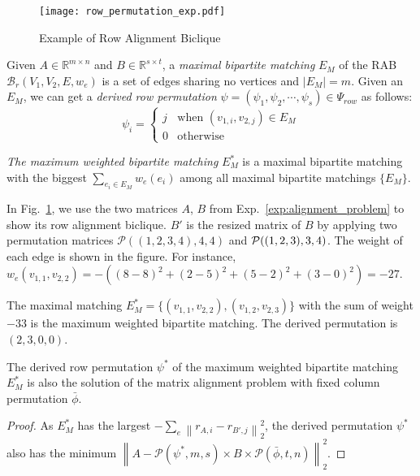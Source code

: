 \documentclass[conference]{IEEEtran}
\begin{document}
{\begin{figure}[h!]
\centering
\texttt{[image: row\_permutation\_exp.pdf]}
\caption{Example of Row Alignment Biclique}
\label{fig:row_permutation_exp}
\end{figure}


Given $A \in \mathbb{R}^{m\times n}$ and $B \in \mathbb{R}^{s\times t}$, a \emph{maximal bipartite matching} $E_M$ of the RAB $\mathcal{B}_r(V_1, V_2, E, w_e)$ is a set of edges sharing no vertices and $|E_M| = m$. Given an $E_M$, we can get a \emph{derived row permutation} $\psi = (\psi_1, \psi_2, \cdots, \psi_s) \in \Psi_{row}$ as follows:
\begin{displaymath}
\psi_i = \begin{cases}
j &\text{when\ } (v_{1,i}, v_{2,j}) \in E_M\\
0 &\text{otherwise} %
\end{cases}
\end{displaymath}


\emph{The maximum weighted bipartite matching} $E^*_M$ is a maximal bipartite matching with the biggest $\sum_{e_i\in E_M} w_e(e_i)$ among all maximal bipartite matchings $\{E_M\}$. 


\begin{example} In Fig.~\ref{fig:row_permutation_exp}, we use the two matrices $A$, $B$ from Exp.~\ref{exp:alignment_problem} to show its row alignment biclique. $B'$ is the resized matrix of $B$ by applying two permutation matrices $\mathcal{P}((1,2,3,4), 4, 4)$ and $\mathcal{P}((1,2,3),\\ 3, 4)$. The weight of each edge is shown in the figure. For instance, $w_e(v_{1,1}, v_{2,2}) = - ((8-8)^2 + (2-5)^2 + (5-2)^2 + (3-0)^2) = -27$.


The maximal matching $E_M^* = \{(v_{1,1}, v_{2,2}), (v_{1,2}, v_{2,3})\}$ with the sum of weight $-33$ is the maximum weighted bipartite matching. The derived permutation is $(2,3,0,0)$.
\end{example}






\begin{lemma} The derived row permutation $\psi^*$ of the maximum weighted bipartite matching $E^*_M$ is also the solution of the matrix alignment problem with fixed column permutation $\bar \phi$.
\end{lemma}
\begin{proof}
As $E^*_M$ has the largest $- \sum_{e} \left\|r_{A,i} - r_{B',j}\right\|_2^2$, the derived permutation $\psi^*$ also has the minimum $\left\|A - \mathcal{P}(\psi^*,m,s)\times B \times \mathcal{P}(\bar \phi,t,n)\right\|_2^2$.
\end{proof}


}
\end{document}

